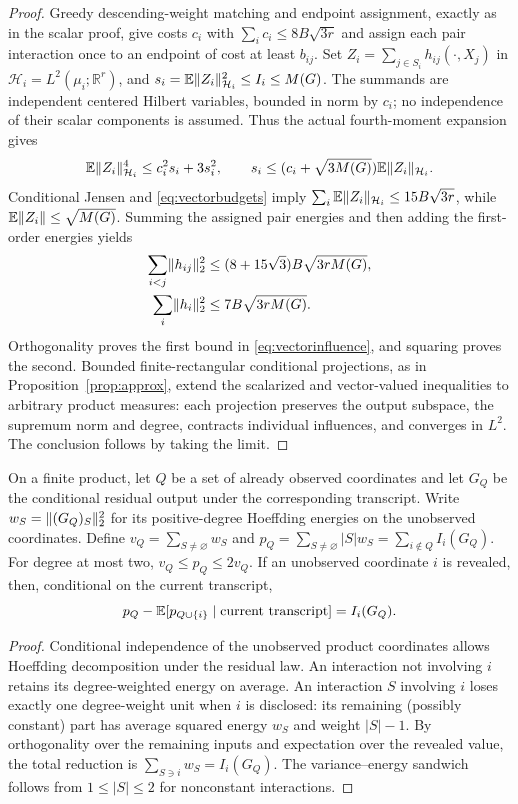 \begin{proof}
Greedy descending-weight matching and endpoint assignment, exactly as in the scalar proof, give costs $c_i$ with $\sum_i c_i\le8B\sqrt{3r}$ and assign each pair interaction once to an endpoint of cost at least $b_{ij}$. Set
$Z_i=\sum_{j\in S_i}h_{ij}(\cdot,X_j)$ in $\mathcal H_i=L^2(\mu_i;\mathbb R^r)$, and
$s_i=\mathbb E\lVert Z_i\rVert_{\mathcal H_i}^2\le I_i\le M(G)$.
The summands are independent centered Hilbert variables, bounded in norm by $c_i$; no independence of their scalar components is assumed. Thus the actual fourth-moment expansion gives
\[
 \mathbb E\lVert Z_i\rVert_{\mathcal H_i}^4\le c_i^2s_i+3s_i^2,
 \qquad s_i\le(c_i+\sqrt{3M(G)})\mathbb E\lVert Z_i\rVert_{\mathcal H_i}.
\]
Conditional Jensen and \eqref{eq:vectorbudgets} imply
$\sum_i\mathbb E\lVert Z_i\rVert_{\mathcal H_i}\le15B\sqrt{3r}$,
while $\mathbb E\lVert Z_i\rVert\le\sqrt{M(G)}$. Summing the assigned pair energies and then adding the first-order energies yields
\[
 \begin{aligned}
 \sum_{i<j}\lVert h_{ij}\rVert_2^2
 &\le(8+15\sqrt3)B\sqrt{3r M(G)},\\
 \sum_i\lVert h_i\rVert_2^2
 &\le7B\sqrt{3r M(G)}.
 \end{aligned}
\]
Orthogonality proves the first bound in \eqref{eq:vectorinfluence}, and squaring proves the second.
Bounded finite-rectangular conditional projections, as in Proposition~\ref{prop:approx}, extend the scalarized and vector-valued inequalities to arbitrary product measures: each projection preserves the output subspace, the supremum norm and degree, contracts individual influences, and converges in $L^2$. The conclusion follows by taking the limit.
\end{proof}

\begin{lemma}\label{lem:posterdelta}
On a finite product, let $Q$ be a set of already observed coordinates and let $G_Q$ be the conditional residual output under the corresponding transcript. Write $w_S=\lVert (G_Q)_S\rVert_2^2$ for its positive-degree Hoeffding energies on the unobserved coordinates. Define $v_Q=\sum_{S\ne\varnothing}w_S$ and $p_Q=\sum_{S\ne\varnothing}|S|w_S=\sum_{i\notin Q}I_i(G_Q)$. For degree at most two, $v_Q\le p_Q\le2v_Q$. If an unobserved coordinate $i$ is revealed, then, conditional on the current transcript,
\begin{equation}\label{eq:posterior-drift-exact}
 p_Q-\mathbb E[p_{Q\cup\{i\}}\mid\text{current transcript}]=I_i(G_Q).
\end{equation}
\end{lemma}
\begin{proof}
Conditional independence of the unobserved product coordinates allows Hoeffding decomposition under the residual law. An interaction not involving $i$ retains its degree-weighted energy on average. An interaction $S$ involving $i$ loses exactly one degree-weight unit when $i$ is disclosed: its remaining (possibly constant) part has average squared energy $w_S$ and weight $|S|-1$. By orthogonality over the remaining inputs and expectation over the revealed value, the total reduction is $\sum_{S\ni i}w_S=I_i(G_Q)$. The variance--energy sandwich follows from $1\le|S|\le2$ for nonconstant interactions.
\end{proof}

